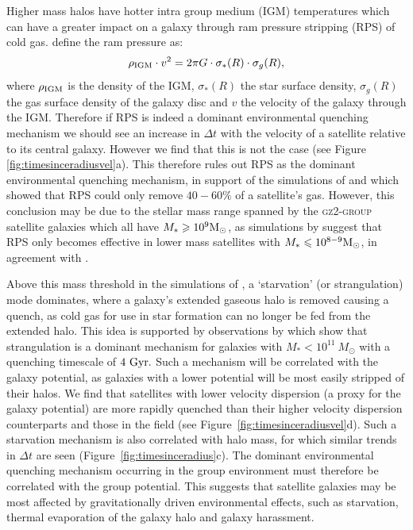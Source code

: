 \documentclass[useAMS,usenatbib]{mn2e}
\begin{document}
Higher mass halos have hotter intra group medium (IGM) temperatures \citep{shimizu03, delpopolo05} which can have a greater impact on a galaxy through ram pressure stripping (RPS) of cold gas. \cite{gunngott72} define the ram pressure as:
\begin{equation}\label{eq:rps}
\rho_{\rm{IGM}}\cdot v^2 = 2\pi G \cdot \sigma_*(R) \cdot \sigma_g(R),
\end{equation}
where $\rho_{\rm{IGM}}$ is the density of the IGM, $\sigma_*(R)$ the star surface density, $\sigma_g(R)$ the gas surface density of the galaxy disc and $v$ the velocity of the galaxy through the IGM. Therefore if RPS is indeed a dominant environmental quenching mechanism we should see an increase in $\Delta t$ with the velocity of a satellite relative to its central galaxy.  However we find that this is not the case (see Figure \ref{fig:timesinceradiusvel}a). This therefore rules out RPS as the dominant environmental quenching mechanism, in support of the simulations of \citet{emerick16} and \citet{fillingham16} which showed that RPS could only remove $40-60\%$ of a satellite's gas. However, this conclusion may be due to the stellar mass range spanned by the \textsc{gz2-group} satellite galaxies which all have $M_* \geq 10^9 \rm{M}_{\odot}$, as simulations by \cite{fillingham16} suggest that RPS only becomes effective in lower mass satellites with $M_* \leq 10^{8-9} \rm{M}_{\odot}$, in agreement with \cite{hester06}. 

Above this mass threshold in the simulations of \cite{fillingham16}, a `starvation' (or strangulation) mode \citep{larson80, balogh00} dominates, where a galaxy's extended gaseous halo is removed causing a quench, as cold gas for use in star formation can no longer be fed from the extended halo. This idea is supported by observations by \citet{peng10} which show that strangulation is a dominant mechanism for galaxies with $M_* < 10^{11}~M_{\odot}$ with a quenching timescale of $4~\rm{Gyr}.$ Such a mechanism will be correlated with the galaxy potential, as galaxies with a lower potential will be most easily stripped of their halos. We find that satellites with lower velocity dispersion (a proxy for the galaxy potential) are more rapidly quenched than their higher velocity dispersion counterparts and those in the field (see Figure~\ref{fig:timesinceradiusvel}d). Such a starvation mechanism is also correlated with halo mass, for which similar trends in $\Delta t$ are seen (Figure~\ref{fig:timesinceradius}c). The dominant environmental quenching mechanism occurring in the group environment must therefore be correlated with the group potential. This suggests that satellite galaxies may be most affected by gravitationally driven environmental effects, such as starvation, thermal evaporation of the galaxy halo and galaxy harassment. 
\end{document}
